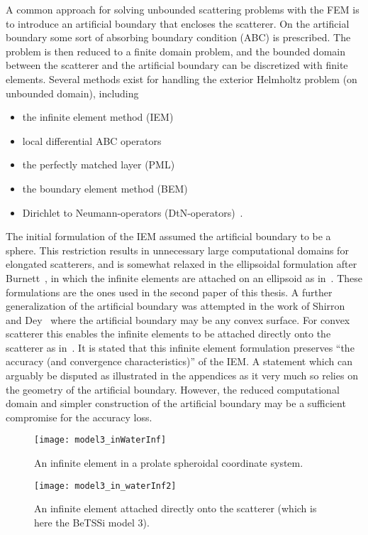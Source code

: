 A common approach for solving unbounded scattering problems with the FEM is to introduce an artificial boundary that encloses the scatterer. On the artificial boundary some sort of absorbing boundary condition (ABC) is prescribed. The problem is then reduced to a finite domain problem, and the bounded domain between the scatterer and the artificial boundary can be discretized with finite elements. Several methods exist for handling the exterior Helmholtz problem (on unbounded domain), including
\begin{itemize}
	\item the infinite element method (IEM)~\cite{Bettess1977ie,Bettess1977dar}
	\item local differential ABC operators~\cite{Shirron1995soe,Bayliss1982bcf,Hagstrom1998afo,Tezaur2001tdf}
	\item the perfectly matched layer (PML)~\cite{Berenger1994apm,Berenger1996pml}
	\item the boundary element method (BEM)~\cite{Sauter2011bem,Schanz2007bea,Marburg2008cao,Chandler_Wilde2012nab}
	\item Dirichlet to Neumann-operators (DtN-operators)~\cite{Givoli2013nmf}.
\end{itemize}
The initial formulation of the IEM assumed the artificial boundary to be a sphere. This restriction results in unnecessary large computational domains for elongated scatterers, and is somewhat relaxed in the ellipsoidal formulation after Burnett~\cite{Burnett1994atd,Burnett1998aea}, in which the infinite elements are attached on an ellipsoid as in~. These formulations are the ones used in the second paper of this thesis. A further generalization of the artificial boundary was attempted in the work of Shirron and Dey~\cite{Shirron2002aie} where the artificial boundary may be any convex surface. For convex scatterer this enables the infinite elements to be attached directly onto the scatterer as in~. It is stated that this infinite element formulation preserves ``the accuracy (and convergence characteristics)'' of the IEM. A statement which can arguably be disputed as illustrated in the appendices as it very much so relies on the geometry of the artificial boundary. However, the reduced computational domain and simpler construction of the artificial boundary may be a sufficient compromise for the accuracy loss. 

\begin{figure}
	\centering
	\texttt{[image: model3\_inWaterInf]}
	\caption{An infinite element in a prolate spheroidal coordinate system.}
	\label{Fig:model3_inWaterInf}
\end{figure}
\begin{figure}
	\centering
	\texttt{[image: model3\_in\_waterInf2]}
	\caption{An infinite element attached directly onto the scatterer (which is here the BeTSSi model 3).}
	\label{Fig:model3_in_waterInf2}
\end{figure}

